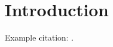 \documentclass[a4paper,12pt]{article}
\begin{document}


\tableofcontents
\pagebreak

\section{Introduction}

Example citation: \cite{Rdimtools}.

\pagebreak
\printbibliography
\end{document}
